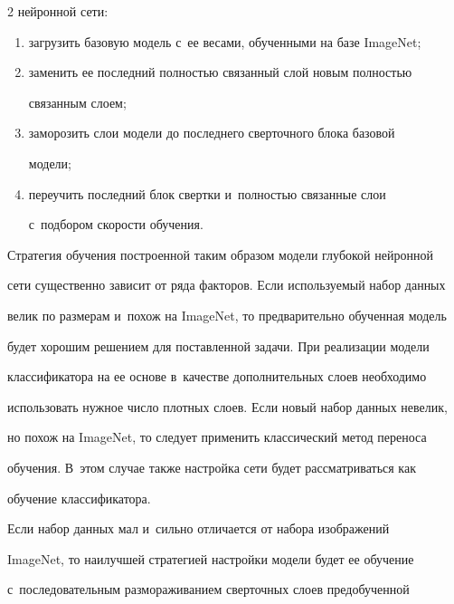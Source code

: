 \begin{multicols}{2}
нейронной сети: 

  \begin{enumerate}[(1)]

\item загрузить базовую модель с~ее весами, обученными на базе ImageNet;

\item заменить ее последний пол\-ностью связанный слой новым пол\-ностью 

связанным слоем;

\item заморозить слои модели до последнего сверточного блока базовой 

модели;

\item переучить последний блок свертки и~пол\-ностью связанные слои 

с~подбором ско\-рости обучения.

\end{enumerate}



  Стратегия обучения построенной таким образом модели глубокой нейронной 

сети существенно зависит от ряда факторов. Если используемый набор данных 

велик по размерам и~похож на \mbox{ImageNet}, то предварительно обученная модель 

будет хорошим решением для поставленной задачи. При реализации модели 

классификатора на ее основе в~качестве дополнительных слоев необходимо 

использовать нужное число плотных слоев. Если новый набор данных невелик, 

но похож на ImageNet, то следует применить классический метод переноса 

обучения. В~этом случае также настройка сети будет рассматриваться как 

обучение клас\-си\-фи\-ка\-тора. 

{



}

  

  Если набор данных мал и~сильно отличается от набора изображений 

ImageNet, то наилучшей стратегией настройки модели будет ее обучение 

с~последовательным размораживанием сверточных слоев предобученной 


\end{multicols}
